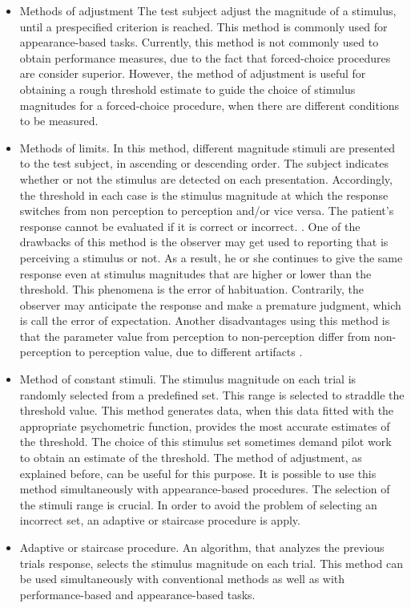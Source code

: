 \begin{itemize}
	
	\item Methods of adjustment 
	The test subject adjust the magnitude of a stimulus, until a prespecified criterion is reached. This method is commonly used for appearance-based tasks. Currently, this method is not commonly used to obtain performance measures, due to the fact that forced-choice procedures are consider superior. However, the method of adjustment is useful for obtaining a rough threshold estimate to guide the choice of stimulus magnitudes for a forced-choice procedure, when there are different conditions to be measured.
	\item Methods of limits. In this method, different magnitude stimuli are presented to the test subject, in ascending or descending order. The subject indicates whether or not the stimulus are detected on each presentation. Accordingly, the threshold in each case is the stimulus magnitude at which the response switches from non perception to perception and/or vice versa. The patient's response cannot be evaluated if it is correct or incorrect. \cite{chapter3}. One of the drawbacks of this method  is the observer may get used to reporting that is perceiving a stimulus or not. As a result, he or she  continues to give the same response even at stimulus magnitudes that are higher or lower than the threshold. This phenomena is the error of habituation. Contrarily, the observer may anticipate the response and make a premature judgment, which is call the error of expectation. Another disadvantages using this method is that the parameter value from perception to non-perception differ from non-perception to perception value, due to different artifacts \cite{hysteresis}.
	\item Method of constant stimuli. The stimulus magnitude on each trial is randomly selected from a predefined set. This range is selected to straddle the threshold value. This method generates data, when this data fitted with the appropriate psychometric function, provides the most accurate estimates of the threshold. The choice of this stimulus set sometimes demand pilot work to obtain an estimate of the threshold. The method of adjustment, as explained before, can be useful for this purpose. It is possible to use this method simultaneously with appearance-based procedures. The selection of the stimuli range is crucial. In order to avoid the problem of selecting an incorrect set, an adaptive or staircase procedure is apply.
	\item Adaptive or staircase procedure. An algorithm, that analyzes the previous trials response, selects the stimulus magnitude on each trial. This method can be used simultaneously  with conventional methods as well as with performance-based and appearance-based tasks.

\end{itemize}
